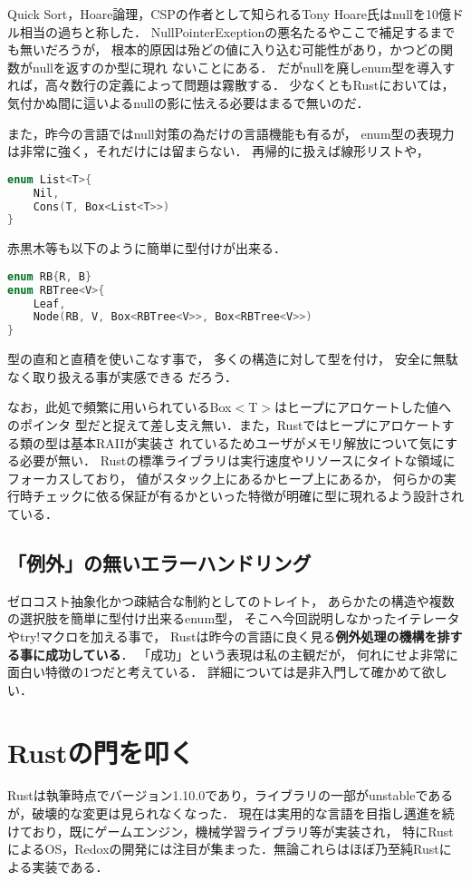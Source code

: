 Quick Sort，Hoare論理，CSPの作者として知られるTony Hoare氏はnullを10億ドル相当の過ちと称した．
NullPointerExeptionの悪名たるやここで補足するまでも無いだろうが，
根本的原因は殆どの値に入り込む可能性があり，かつどの関数がnullを返すのか型に現れ
ないことにある．
だがnullを廃しenum型を導入すれば，高々数行の定義によって問題は霧散する．
少なくともRustにおいては，気付かぬ間に這いよるnullの影に怯える必要はまるで無いのだ．

また，昨今の言語ではnull対策の為だけの言語機能も有るが，
enum型の表現力は非常に強く，それだけには留まらない．
再帰的に扱えば線形リストや，

\begin{lstlisting}[language={C++},caption=線形リスト,label=list_t]
enum List<T>{
    Nil,
    Cons(T, Box<List<T>>)
}
\end{lstlisting}

赤黒木等も以下のように簡単に型付けが出来る．

\begin{lstlisting}[language={C++},caption=赤黒木,label=abt_t]
enum RB{R, B}
enum RBTree<V>{
    Leaf,
    Node(RB, V, Box<RBTree<V>>, Box<RBTree<V>>)
}
\end{lstlisting}

型の直和と直積を使いこなす事で，
多くの構造に対して型を付け，
安全に無駄なく取り扱える事が実感できる
だろう．

なお，此処で頻繁に用いられているBox$<$T$>$はヒープにアロケートした値へのポインタ
型だと捉えて差し支え無い．また，Rustではヒープにアロケートする類の型は基本RAIIが実装さ
れているためユーザがメモリ解放について気にする必要が無い．
Rustの標準ライブラリは実行速度やリソースにタイトな領域にフォーカスしており，
値がスタック上にあるかヒープ上にあるか，
何らかの実行時チェックに依る保証が有るかといった特徴が明確に型に現れるよう設計されている．

\subsection{「例外」の無いエラーハンドリング}
ゼロコスト抽象化かつ疎結合な制約としてのトレイト，
あらかたの構造や複数の選択肢を簡単に型付け出来るenum型，
そこへ今回説明しなかったイテレータやtry!マクロを加える事で，
Rustは昨今の言語に良く見る\textbf{例外処理の機構を排する事に成功している}．
「成功」という表現は私の主観だが，
何れにせよ非常に面白い特徴の1つだと考えている．
詳細については是非入門して確かめて欲しい．

\section{Rustの門を叩く}
Rustは執筆時点でバージョン1.10.0であり，ライブラリの一部がunstableであるが，破壊的な変更は見られなくなった．
現在は実用的な言語を目指し邁進を続けており，既にゲームエンジン，機械学習ライブラリ等が実装され，
特にRustによるOS，Redoxの開発には注目が集まった．無論これらはほぼ乃至純Rustによる実装である．

